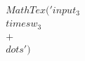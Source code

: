 \documentclass[preview]{standalone}
\begin{document}
\begin{align*}
MathTex('input _ 3  \\times  w _ 3 \\ +\\dots')
\end{align*}
\end{document}
